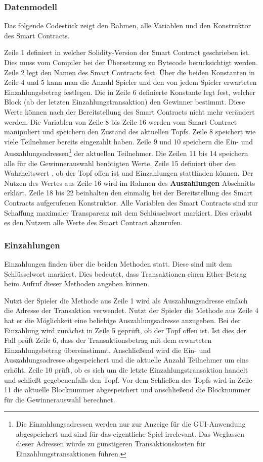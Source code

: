 \subsubsection{Datenmodell}
Das folgende Codestück zeigt den Rahmen, alle Variablen und den Konstruktor des Smart Contracts.

Zeile 1 definiert in welcher Solidity-Version der Smart Contract geschrieben ist. Dies muss vom Compiler bei der Übersetzung zu Bytecode berücksichtigt werden. Zeile 2 legt den Namen des Smart Contracts fest. Über die beiden Konstanten in Zeile 4 und 5 kann man die Anzahl Spieler und den von jedem Spieler erwarteten Einzahlungsbetrag festlegen. Die in Zeile 6 definierte Konstante legt fest, welcher Block (ab der letzten Einzahlungstransaktion) den Gewinner bestimmt. Diese Werte können nach der Bereitstellung des Smart Contracts nicht mehr verändert werden. Die Variablen von Zeile 8 bis Zeile 16 werden vom Smart Contract manipuliert und speichern den Zustand des aktuellen Topfs. Zeile 8 speichert wie viele Teilnehmer bereits eingezahlt haben. Zeile 9 und 10 speichern die Ein- und Auszahlungsadressen\footnote{Die Einzahlungsadressen werden nur zur Anzeige für die GUI-Anwendung abgespeichert und sind für das eigentliche Spiel irrelevant. Das Weglassen dieser Adressen würde zu günstigeren Transaktionskosten für Einzahlungstransaktionen führen.} der aktuellen Teilnehmer. Die Zeilen 11 bis 14 speichern alle für die Gewinnerauswahl benötigten Werte. Zeile 15 definiert über den Wahrheitswert , ob der Topf offen ist und Einzahlungen stattfinden können. Der Nutzen des Wertes aus Zeile 16 wird im Rahmen des \textbf{Auszahlungen} Abschnitts erklärt. Zeile 18 bis 22 beinhalten den einmalig bei der Bereitstellung des Smart Contracts aufgerufenen Konstruktor. Alle Variablen des Smart Contracts sind zur Schaffung maximaler Transparenz mit dem Schlüsselwort  markiert. Dies erlaubt es den Nutzern alle Werte des Smart Contract abzurufen.

\subsubsection{Einzahlungen}
Einzahlungen finden über die beiden  Methoden statt. Diese sind mit dem Schlüsselwort  markiert. Dies bedeutet, dass Transaktionen einen Ether-Betrag beim Aufruf dieser Methoden angeben können.

Nutzt der Spieler die Methode aus Zeile 1 wird als Auszahlungsadresse einfach die Adresse der Transaktion verwendet. Nutzt der Spieler die Methode aus Zeile 4 hat er die Möglichkeit eine beliebige Auszahlungsadresse anzugeben. Bei der Einzahlung wird zunächst in Zeile 5 geprüft, ob der Topf offen ist. Ist dies der Fall prüft Zeile 6, dass der Transaktionsbetrag mit dem erwarteten Einzahlungsbetrag übereinstimmt. Anschließend wird die Ein- und Auszahlungsadresse abgespeichert und die aktuelle Anzahl Teilnehmer um eins erhöht. Zeile 10 prüft, ob es sich um die letzte Einzahlungstransaktion handelt und schließt gegebenenfalls den Topf. Vor dem Schließen des Topfs wird in Zeile 11 die aktuelle Blocknummer abgespeichert und anschließend die Blocknummer für die Gewinnerauswahl berechnet.

